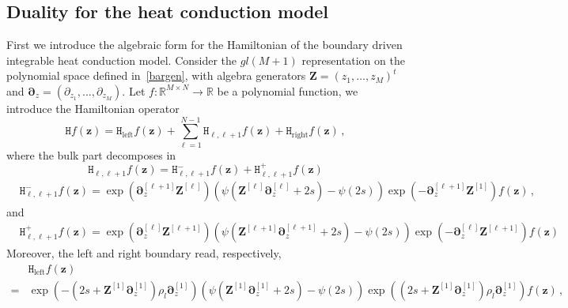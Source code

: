 \documentclass[11pt]{article}
\numberwithin{equation}{section}
\newcommand{\M}{M}
\newcommand{\N}{N}
\newcommand{\ecdH}{\mathtt{H}}
\newcommand{\heat}{z}
\newcommand{\Heat}{Z}
\begin{document}
\subsection{Duality for the heat conduction model}
First we introduce the algebraic form for the Hamiltonian of the boundary driven integrable heat conduction model. Consider the $gl(\M+1)$ representation on the polynomial space defined in~\eqref{bargen}, with algebra generators $\bm{\Heat}=(\heat_{1},\ldots,\heat_{\M})^{t}$ and $\bm{\partial}_{\heat}=(\partial_{\heat_1},\ldots,\partial_{\heat_\M})$.  Let $f:\mathbb{R}^{\M\times \N}\to \mathbb{R}$ be a polynomial function, we introduce the Hamiltonian operator 
    \begin{equation}\label{Heat-Hamiltonian}
	\ecdH f(\bm{\heat})=\ecdH_{\text{left}}f(\bm{\heat})+\sum_{\ell=1}^{\N-1}\ecdH_{\ell,\ell+1}f(\bm{\heat})+\ecdH_{\text{right}}f(\bm{\heat})\,,
\end{equation}
where the bulk part decomposes in
\begin{equation}
    \ecdH_{\ell,\ell+1}f(\bm{\heat})=\ecdH_{\ell,\ell+1}^{-}f(\bm{\heat})+\ecdH_{\ell,\ell+1}^{+}f(\bm{\heat})
\end{equation}
 \begin{equation}
  \begin{split}
	&\ecdH_{\ell,\ell+1}^{-}f(\bm{\heat})=\exp{\left(\bm{\partial}^{[\ell+1]}_{\heat}\bm{\Heat}^{[\ell]}\right)}
       \left(\psi(\bm{\Heat}^{[\ell]}\bm{\partial}^{[\ell]}_{\heat}+2s)-\psi(2s)\right)\exp{\left(-\bm{\partial}^{[\ell+1]}_{\heat}\bm{\Heat}^{[1]}\right)}f(\bm{\heat})\,,
      \end{split}
\end{equation}
and 
  \begin{equation}
  \begin{split}
	&\ecdH_{\ell,\ell+1}^{+}f(\bm{\heat})=\exp{\left(\bm{\partial}^{[\ell]}_{\heat}\bm{\Heat}^{[\ell+1]}\right)}
        \left(\psi(\bm{\Heat}^{[\ell+1]}\bm{\partial}^{[\ell+1]}_{\heat}+2s)-\psi(2s)\right)\exp{\left(-\bm{\partial}^{[\ell]}_{\heat}\bm{\Heat}^{[\ell+1]}\right)}f(\bm{\heat})
        \end{split}
\end{equation}
Moreover, the left and right boundary read, respectively,
\begin{equation}
\begin{split}
	&\ecdH_{\text{left}}f(\bm{\heat})
    \\=&
      \exp{\left(-    \left(2s+\bm{\Heat}^{[1]}\bm{\partial}^{[1]}_{\heat}
        \right)
    \rho_{l}\bm{\partial}^{[1]}_{\heat}\right)}
    		\left(\psi(\bm{\Heat}^{[1]}\bm{\partial}^{[1]}_{\heat}+2s)
        -\psi(2s)\right)
	    \exp{\left(    \left(2s+\bm{\Heat}^{[1]}\bm{\partial}^{[1]}_{\heat}
        \right)
    \rho_{l}\bm{\partial}^{[1]}_{\heat}\right)}f(\bm{\heat})\,,
	    \end{split}
\end{equation}
\end{document}
